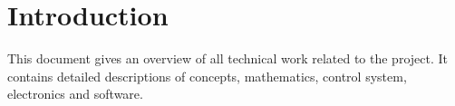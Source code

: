 \section{Introduction}

This document gives an overview of all technical work related to the project. It contains detailed descriptions of concepts, mathematics, control system, electronics and software.
